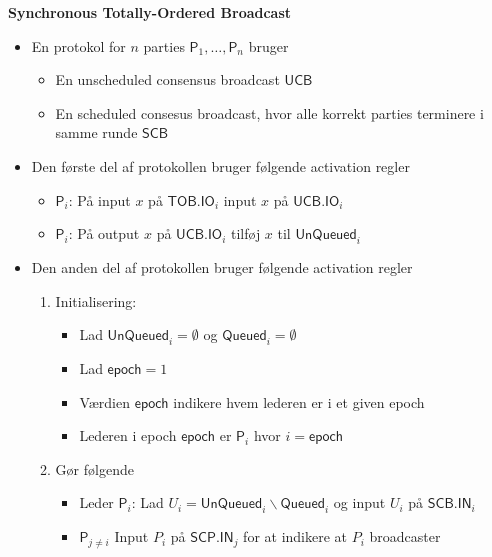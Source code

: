 \documentclass[a4, english]{article}
\begin{document}
\begin{framed}  
  \begin{center}  
     \textbf{Synchronous Totally-Ordered Broadcast}
  \end{center}
  \begin{itemize}
  	\item En protokol for $n$ parties $\mathsf{P}_1, \dots, \mathsf{P}_n$ bruger
    \begin{itemize}
    	\item En unscheduled consensus broadcast $\mathsf{UCB}$ 
      \item En scheduled consesus broadcast, hvor alle korrekt parties terminere i samme runde $\mathsf{SCB}$  
    \end{itemize}
    \item Den første del af protokollen bruger følgende activation regler 
    \begin{itemize}
    	\item $\mathsf{P}_i$: På input $x$ på $\mathsf{TOB}.\mathsf{IO}_i$ input $x$ på $\mathsf{UCB}.\mathsf{IO}_i$
      \item $\mathsf{P}_i$: På output $x$ på $\mathsf{UCB}.\mathsf{IO}_i$ tilføj $x$ til $\mathsf{UnQueued}_i$ 
    \end{itemize}
    \item Den anden del af protokollen bruger følgende activation regler 
    \begin{enumerate}
    	\item Initialisering:
      \begin{itemize}
        \item Lad $\mathsf{UnQueued}_i = \emptyset$ og $\mathsf{Queued}_i = \emptyset$ 
        \item Lad $\mathsf{epoch} = 1$ 
        \item Værdien $\mathsf{epoch}$ indikere hvem lederen er i et given epoch
        \item Lederen i epoch $\mathsf{epoch}$ er $\mathsf{P}_i$ hvor $i=\mathsf{epoch}$ 
      \end{itemize}
      \item Gør følgende
      \begin{itemize}
        \item Leder $\mathsf{P}_i$: Lad $U_i = \mathsf{UnQueued}_i \backslash \mathsf{Queued}_i$ og input $U_i$ på $\mathsf{SCB}.\mathsf{IN}_i$ 
        \item $\mathsf{P}_{j \ne i}$ Input $P_i$ på $\mathsf{SCP}.\mathsf{IN}_j$ for at indikere at $P_i$ broadcaster 

\end{itemize}
\end{enumerate}
\end{itemize}
\end{framed}
\end{document}

